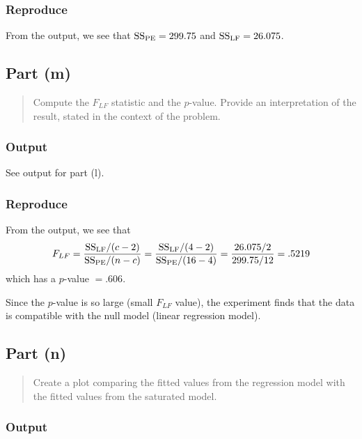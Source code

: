 \documentclass[
]{article}
\begin{document}
\hypertarget{reproduce-9}{%
\subsubsection{Reproduce}\label{reproduce-9}}

From the output, we see that \(\mathrm{SS_{PE}} = 299.75\) and
\(\mathrm{SS_{LF}} = 26.075\).

\hypertarget{part-m}{%
\subsection{Part (m)}\label{part-m}}

\begin{quote}
Compute the \(F_{LF}\) statistic and the \(p\)-value. Provide an
interpretation of the result, stated in the context of the problem.
\end{quote}

\hypertarget{output-6}{%
\subsubsection{Output}\label{output-6}}

See output for part (l).

\hypertarget{reproduce-10}{%
\subsubsection{Reproduce}\label{reproduce-10}}

From the output, we see that \[
  F_{LF} = \frac{\mathrm{SS_{LF}}/(c-2)}{\mathrm{SS_{PE}}/(n-c)} = \frac{\mathrm{SS_{LF}}/(4-2)}{\mathrm{SS_{PE}}/(16-4)} = \frac{26.075/2}{299.75/12} = .5219
\] which has a \(p\)-value \(= .606\).

Since the \(p\)-value is so large (small \(F_{LF}\) value), the
experiment finds that the data is compatible with the null model (linear
regression model).

\hypertarget{part-n}{%
\subsection{Part (n)}\label{part-n}}

\begin{quote}
Create a plot comparing the fitted values from the regression model with
the fitted values from the saturated model.
\end{quote}

\hypertarget{output-7}{%
\subsubsection{Output}\label{output-7}}
\end{document}
